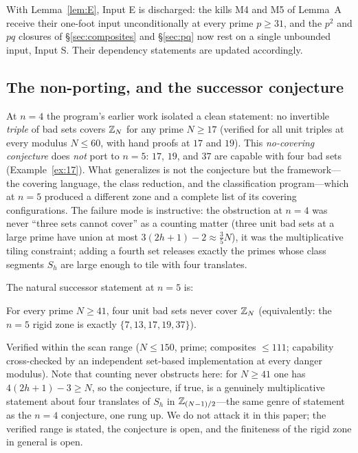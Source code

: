 With Lemma~\ref{lem:E}, Input E is discharged: the kills M4 and M5 of
Lemma~A receive their one-foot input unconditionally at every prime
$p\ge31$, and the $p^2$ and $pq$ closures of \S\ref{sec:composites} and
\S\ref{sec:pq} now rest on a single unbounded input, Input S. Their
dependency statements are updated accordingly.

\subsection{The non-porting, and the successor conjecture}

At $n=4$ the program's earlier work isolated a clean statement: no
invertible \emph{triple} of bad sets covers $\mathbb{Z}_N$ for any prime
$N\ge 17$ (verified for all unit triples at every modulus $N\le 60$, with
hand proofs at $17$ and $19$). This \emph{no-covering conjecture} does
\emph{not} port to $n=5$: $17$, $19$, and $37$ are capable with four bad
sets (Example~\ref{ex:17}). What generalizes is not the conjecture but the
framework---the covering language, the class reduction, and the
classification program---which at $n=5$ produced a different zone and a
complete list of its covering configurations. The failure mode is
instructive: the obstruction at $n=4$ was never ``three sets cannot
cover'' as a counting matter (three unit bad sets at a large prime have
union at most $3(2h+1)-2\approx \tfrac35 N$), it was the multiplicative
tiling constraint; adding a fourth set releases exactly the primes whose
class segments $S_h$ are large enough to tile with four translates.

The natural successor statement at $n=5$ is:

\begin{conjecture}\label{conj:successor}
For every prime $N\ge 41$, four unit bad sets never cover $\mathbb{Z}_N$
(equivalently: the $n=5$ rigid zone is exactly $\{7,13,17,19,37\}$).
\end{conjecture}

\noindent Verified within the scan range ($N\le 150$, prime; composites
$\le 111$; capability cross-checked by an independent set-based
implementation at every danger modulus). Note that counting never
obstructs here: for $N\ge 41$ one has $4(2h+1)-3\ge N$, so the
conjecture, if true, is a genuinely multiplicative statement about four
translates of $S_h$ in $\mathbb{Z}_{(N-1)/2}$---the same genre of statement as
the $n=4$ conjecture, one rung up. We do not attack it in this paper; the
verified range is stated, the conjecture is open, and the finiteness of
the rigid zone in general is open.
